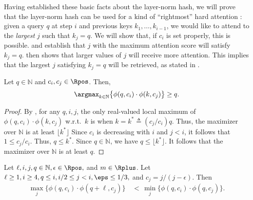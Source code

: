 Having established these basic facts about the layer-norm hash, we will prove that the layer-norm hash can be used for a kind of ``rightmost'' hard attention \citep{hao2022ac0}: given a query $q$ at step $i$ and previous keys $k_1, \ldots, k_{i-1}$, we would like to attend to the \emph{largest} $j$ such that $k_j = q$. We will show that, if $c_i$ is set properly, this is possible.  and  establish that $j$ with the maximum attention score will satisfy $k_j = q$.  then shows that larger values of $j$ will receive more attention. This implies that the largest $j$ satisfying $k_j = q$ will be retrieved, as stated in .

\begin{lemma} \label{lem:at-least-q}
    Let $q \in \mathbb N$ and $c_i, c_j \in \Rpos$.
    Then,
    \begin{equation*}
        \argmax_{k \in \mathbb N} \big\{ \phi(q, c_i) \cdot \phi(k, c_j) \big\} \geq q .
    \end{equation*}
\end{lemma}

\begin{proof}
    By , for any $q, i, j$, the only real-valued local maximum of $\phi(q, c_i) \cdot \phi(k, c_j)$ w.r.t.~$k$ is when $k = k^* \triangleq (c_j/c_i) q$. 
    Thus, the maximizer over $\mathbb N$ is at least  $\lfloor k^* \rfloor$
    Since $c_i$ is decreasing with $i$ and  $j < i$, it follows that $1 \leq c_j / c_i$. Thus, $q \leq k^*$. Since $q \in \mathbb N$, we have $q \leq \lfloor k^* \rfloor$. It follows that the maximizer over $\mathbb N$ is at least $q$.
\end{proof}

\begin{lemma}
    \label{lem:q-plus-one-is-worse}
    Let $\ell, i, j, q \in \mathbb{N}, \epsilon \in \Rpos,$ and $m \in \Rplus$. Let $\ell \geq 1, i \geq 4, q \leq i, i/2 \leq j < i, \eps \leq 1/3,$ and $c_j = j / (j - \epsilon)$. Then %
    \begin{align}
        \label{eq:q-plus-one-is-worse}
        \max_j \big\{ \phi(q, c_i) \cdot \phi(q+\ell, c_j) \big\}
        & \, < \, \min_j \big\{ \phi(q, c_i) \cdot \phi(q, c_j) \big\}.
    \end{align}
\end{lemma}

